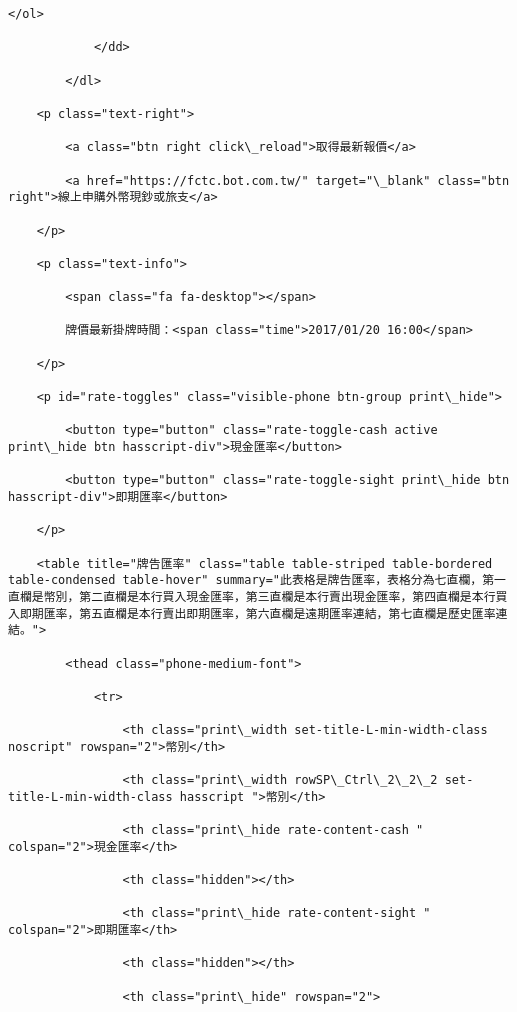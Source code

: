 \documentclass[11pt]{article}
\begin{document}
\begin{Verbatim}[commandchars=\\\{\}]
                </ol>

            </dd>

        </dl>

    <p class="text-right">

        <a class="btn right click\_reload">取得最新報價</a>

        <a href="https://fctc.bot.com.tw/" target="\_blank" class="btn right">線上申購外幣現鈔或旅支</a>

    </p>

    <p class="text-info">

        <span class="fa fa-desktop"></span>

        牌價最新掛牌時間：<span class="time">2017/01/20 16:00</span>

    </p>

    <p id="rate-toggles" class="visible-phone btn-group print\_hide">

        <button type="button" class="rate-toggle-cash active print\_hide btn hasscript-div">現金匯率</button>

        <button type="button" class="rate-toggle-sight print\_hide btn hasscript-div">即期匯率</button>

    </p>

    <table title="牌告匯率" class="table table-striped table-bordered table-condensed table-hover" summary="此表格是牌告匯率，表格分為七直欄，第一直欄是幣別，第二直欄是本行買入現金匯率，第三直欄是本行賣出現金匯率，第四直欄是本行買入即期匯率，第五直欄是本行賣出即期匯率，第六直欄是遠期匯率連結，第七直欄是歷史匯率連結。">

        <thead class="phone-medium-font">

            <tr>

                <th class="print\_width set-title-L-min-width-class noscript" rowspan="2">幣別</th>

                <th class="print\_width rowSP\_Ctrl\_2\_2\_2 set-title-L-min-width-class hasscript ">幣別</th>

                <th class="print\_hide rate-content-cash " colspan="2">現金匯率</th>

                <th class="hidden"></th>

                <th class="print\_hide rate-content-sight " colspan="2">即期匯率</th>

                <th class="hidden"></th>

                <th class="print\_hide" rowspan="2">


\end{Verbatim}
\end{document}
